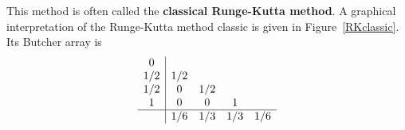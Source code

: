 This method is often called the
{\bfseries classical Runge-Kutta method}.
A graphical interpretation of the Runge-Kutta method classic is given
in Figure~\ref{RKclassic}.  Its Butcher array is
\[
\begin{array}{c|cccc}
0 & & & & \\
1/2 & 1/2 & & & \\
1/2 & 0 & 1/2 & & \\
1 & 0 & 0 & 1 & \\
\hline
& 1/6 & 1/3 & 1/3 & 1/6
\end{array}
\]


